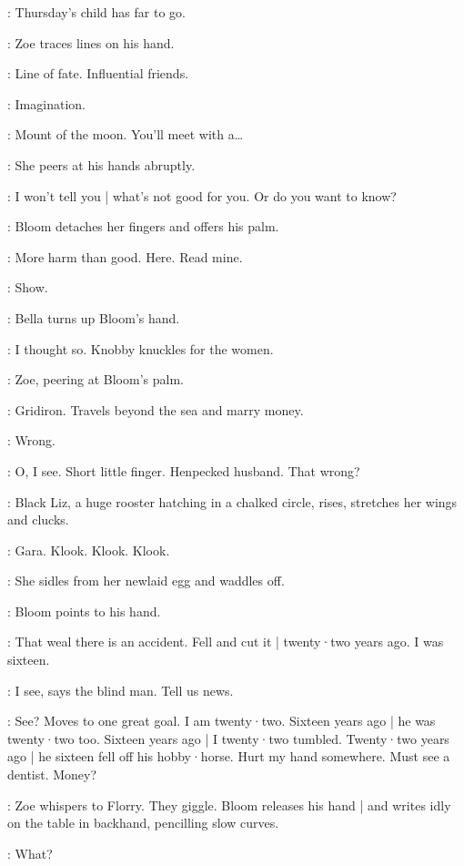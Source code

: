 \Zoe:
Thursday's child has far to go.

:
Zoe traces lines on his hand.

\Zoe:
Line of fate.
Influential friends.

\Florry:
Imagination.

\Zoe:
Mount of the moon.
You'll meet with a…

:
She peers at his hands abruptly.

\Zoe:
I won't tell you |
what's not good for you.
Or do you want to know?

:
Bloom detaches her fingers and offers his palm.

\Bloom:
More harm than good.
Here.
Read mine.

\Bella:
Show.

:
Bella turns up Bloom's hand.

\Bella:
I thought so.
Knobby knuckles for the women.

:
Zoe,
peering at Bloom's palm.

\Zoe:
Gridiron.
Travels beyond the sea and marry money.

\Bloom:
Wrong.

\Zoe:
O,
I see.
Short little finger.
Henpecked husband.
That wrong?

:
Black Liz,
a huge rooster hatching in a chalked circle,
rises,
stretches her wings and clucks.

\BlackLiz:
Gara.
Klook.
Klook.
Klook.

:
She sidles from her newlaid egg and waddles off.

:
Bloom points to his hand.

\Bloom:
That weal there is an accident.
Fell and cut it |
twenty·two years ago.
I was sixteen.

\Zoe:
I see,
says the blind man.
Tell us news.

\Stephen:
See?
Moves to one great goal.
I am twenty·two.
Sixteen years ago |
he was twenty·two too.
Sixteen years ago |
I twenty·two tumbled.
Twenty·two years ago |
he sixteen fell off his hobby·horse.
Hurt my hand somewhere.
Must see a dentist.
Money?

:
Zoe whispers to Florry.
They giggle.
Bloom releases his hand |
and writes idly on the table in backhand,
pencilling slow curves.

\Florry:
What?


